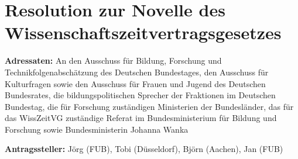 \documentclass[parskip, 10pt,oneside]{scrartcl}
\begin{document}
\section*{Resolution zur Novelle des Wissenschaftszeitvertragsgesetzes}

\textbf{Adressaten:} An den Ausschuss für Bildung, Forschung und Technikfolgenabschätzung des Deutschen Bundestages, den Ausschuss für Kulturfragen sowie den Ausschuss für Frauen und Jugend des Deutschen Bundesrates, die bildungspolitischen Sprecher der Fraktionen im Deutschen Bundestag, die für Forschung zuständigen Ministerien der Bundesländer, das für das WissZeitVG zuständige Referat im Bundesministerium für Bildung und Forschung sowie Bundesministerin Johanna Wanka

\textbf{Antragssteller:} Jörg (FUB), Tobi (Düsseldorf), Björn (Aachen), Jan (FUB)
\end{document}
